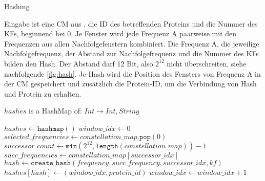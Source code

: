         \begin{algorithm}[H]
            \caption{Hashing}\label{alg:hashing}
            Eingabe ist eine \acl{CM} aus , die ID des betreffenden Proteins und die Nummer des \acl{KF}s, beginnend bei 0. Je Fenster wird jede Frequenz A paarweise mit den Frequenzen aus allen Nachfolgefenstern kombiniert. Die Frequenz A, die jeweilige Nachfolgefrequenz, der Abstand zur Nachfolgefrequenz und die Nummer des \acl{KF}s bilden den Hash. Der Abstand darf 12 Bit, also $2^{12}$ nicht überschreiten, siehe nachfolgende \autoref{fig:hash}. Je Hash wird die Position des Fensters von Frequenz A in der \acl{CM} gespeichert und zusätzlich die Protein-ID, um die Verbindung von Hash und Protein zu erhalten.
            \begin{algorithmic}[1]
                \Ensure $hashes$ is a HashMap of: $Int \rightarrow Int, String$

                \State $hashes \gets \texttt{hashmap}()$
                \State $window\_idx \gets 0$
                \Repeat
                    \State $selected\_frequencies \gets constellation\_map.\texttt{pop}(0)$
                        \State $successor\_count \gets \texttt{min}(2^{12}, \texttt{length}(constellation\_map)) - 1$
                            \State $succ\_frequencies \gets constellation\_map[successor\_idx]$
                                \State $hash \gets \texttt{create\_hash}(frequency, succ\_frequency, successor\_idx, kf)$
                                \State $hashes[hash] \gets (window\_idx, protein\_id)$
                            \EndFor
                        \EndFor
                    \EndFor
                    \State $window\_idx \gets window\_idx + 1$
            \end{algorithmic}
        \end{algorithm}

